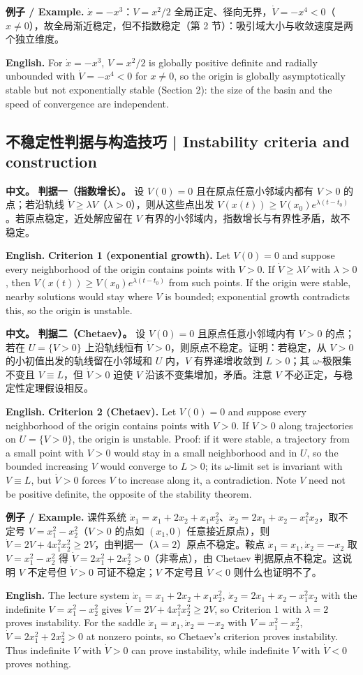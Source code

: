\documentclass[UTF8,11pt,a4paper]{ctexart}
\newcommand{\EN}[1]{\par\noindent\textbf{English.} #1\par}
\newcommand{\EX}[2]{\par\noindent\textbf{例子 / Example.} #1\par\EN{#2}}
\newcommand{\APS}[2]{\par\noindent\textbf{中文。} #1\par\noindent\textbf{English.} #2\par}
\begin{document}
\EX{$\dot x=-x^3$：$V=x^2/2$ 全局正定、径向无界，$\dot V=-x^4<0$（$x\ne0$），故全局渐近稳定，但不指数稳定（第 2 节）：吸引域大小与收敛速度是两个独立维度。}{For $\dot x=-x^3$, $V=x^2/2$ is globally positive definite and radially unbounded with $\dot V=-x^4<0$ for $x\ne0$, so the origin is globally asymptotically stable but not exponentially stable (Section 2): the size of the basin and the speed of convergence are independent.}

\subsection{不稳定性判据与构造技巧 | Instability criteria and construction}
\APS{\textbf{判据一（指数增长）。} 设 $V(0)=0$ 且在原点任意小邻域内都有 $V>0$ 的点；若沿轨线 $\dot V\ge\lambda V$（$\lambda>0$），则从这些点出发 $V(x(t))\ge V(x_0)e^{\lambda(t-t_0)}$。若原点稳定，近处解应留在 $V$ 有界的小邻域内，指数增长与有界性矛盾，故不稳定。}{\textbf{Criterion 1 (exponential growth).} Let $V(0)=0$ and suppose every neighborhood of the origin contains points with $V>0$. If $\dot V\ge\lambda V$ with $\lambda>0$, then $V(x(t))\ge V(x_0)e^{\lambda(t-t_0)}$ from such points. If the origin were stable, nearby solutions would stay where $V$ is bounded; exponential growth contradicts this, so the origin is unstable.}

\APS{\textbf{判据二（Chetaev）。} 设 $V(0)=0$ 且原点任意小邻域内有 $V>0$ 的点；若在 $U=\{V>0\}$ 上沿轨线恒有 $\dot V>0$，则原点不稳定。证明：若稳定，从 $V>0$ 的小初值出发的轨线留在小邻域和 $U$ 内，$V$ 有界递增收敛到 $L>0$；其 $\omega$-极限集不变且 $V\equiv L$，但 $\dot V>0$ 迫使 $V$ 沿该不变集增加，矛盾。注意 $V$ 不必正定，与稳定性定理假设相反。}{\textbf{Criterion 2 (Chetaev).} Let $V(0)=0$ and suppose every neighborhood of the origin contains points with $V>0$. If $\dot V>0$ along trajectories on $U=\{V>0\}$, the origin is unstable. Proof: if it were stable, a trajectory from a small point with $V>0$ would stay in a small neighborhood and in $U$, so the bounded increasing $V$ would converge to $L>0$; its $\omega$-limit set is invariant with $V\equiv L$, but $\dot V>0$ forces $V$ to increase along it, a contradiction. Note $V$ need not be positive definite, the opposite of the stability theorem.}

\EX{课件系统 $\dot x_1=x_1+2x_2+x_1x_2^2$、$\dot x_2=2x_1+x_2-x_1^2x_2$，取不定号 $V=x_1^2-x_2^2$（$V>0$ 的点如 $(x_1,0)$ 任意接近原点），则 $\dot V=2V+4x_1^2x_2^2\ge2V$，由判据一（$\lambda=2$）原点不稳定。鞍点 $\dot x_1=x_1,\dot x_2=-x_2$ 取 $V=x_1^2-x_2^2$ 得 $\dot V=2x_1^2+2x_2^2>0$（非零点），由 Chetaev 判据原点不稳定。这说明 $V$ 不定号但 $\dot V>0$ 可证不稳定；$V$ 不定号且 $\dot V<0$ 则什么也证明不了。}{The lecture system $\dot x_1=x_1+2x_2+x_1x_2^2$, $\dot x_2=2x_1+x_2-x_1^2x_2$ with the indefinite $V=x_1^2-x_2^2$ gives $\dot V=2V+4x_1^2x_2^2\ge2V$, so Criterion 1 with $\lambda=2$ proves instability. For the saddle $\dot x_1=x_1,\dot x_2=-x_2$ with $V=x_1^2-x_2^2$, $\dot V=2x_1^2+2x_2^2>0$ at nonzero points, so Chetaev's criterion proves instability. Thus indefinite $V$ with $\dot V>0$ can prove instability, while indefinite $V$ with $\dot V<0$ proves nothing.}
\end{document}
